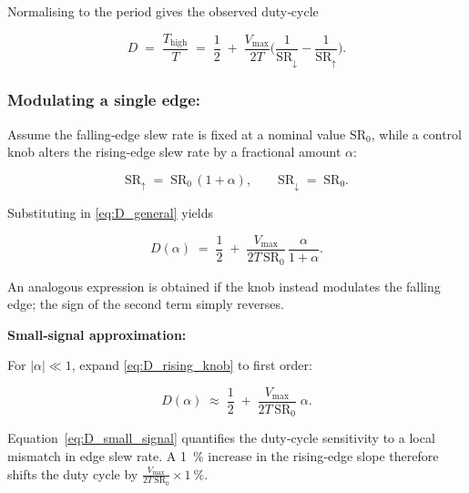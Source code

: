Normalising to the period gives the observed duty‑cycle

\begin{equation}
D
  \;=\;
  \frac{T_{\text{high}}}{T}
  \;=\;
  \frac{1}{2}
  \;+\;
  \frac{V_{\max}}{2T}
  \biggl(
     \frac{1}{\text{SR}_{\downarrow}}
    -\frac{1}{\text{SR}_{\uparrow}}
  \biggr).
\label{eq:D_general}
\end{equation}

\subsubsection{Modulating a single edge:}

Assume the falling‑edge slew rate is fixed at a nominal value
\(\text{SR}_{0}\), while a control knob alters the rising‑edge
slew rate by a fractional amount \(\alpha\):

\begin{equation}
\text{SR}_{\uparrow} \;=\; \text{SR}_{0}\,(1+\alpha),
\qquad
\text{SR}_{\downarrow} \;=\; \text{SR}_{0}.
\end{equation}

Substituting in \eqref{eq:D_general} yields

\begin{equation}
D(\alpha)
  \;=\;
  \frac{1}{2}
  \;+\;
  \frac{V_{\max}}{2T\,\text{SR}_{0}}
  \,\frac{\alpha}{1+\alpha}.
\label{eq:D_rising_knob}
\end{equation}

\noindent
An analogous expression is obtained if the knob instead modulates
the falling edge; the sign of the second term simply reverses.

\textbf{Small‑signal approximation:}

For \(|\alpha|\ll 1\), expand \eqref{eq:D_rising_knob} to first order:

\begin{equation}
D(\alpha)
  \;\approx\;
  \frac{1}{2}
  \;+\;
  \frac{V_{\max}}{2T\,\text{SR}_{0}}\;\alpha.
\label{eq:D_small_signal}
\end{equation}

Equation~\eqref{eq:D_small_signal} quantifies the duty‑cycle
sensitivity to a local mismatch in edge slew rate.  A
\SI{1}{\percent} increase in the rising‑edge slope therefore shifts the
duty cycle by
\(\tfrac{V_{\max}}{2T\,\text{SR}_{0}}\times\SI{1}{\percent}\).


